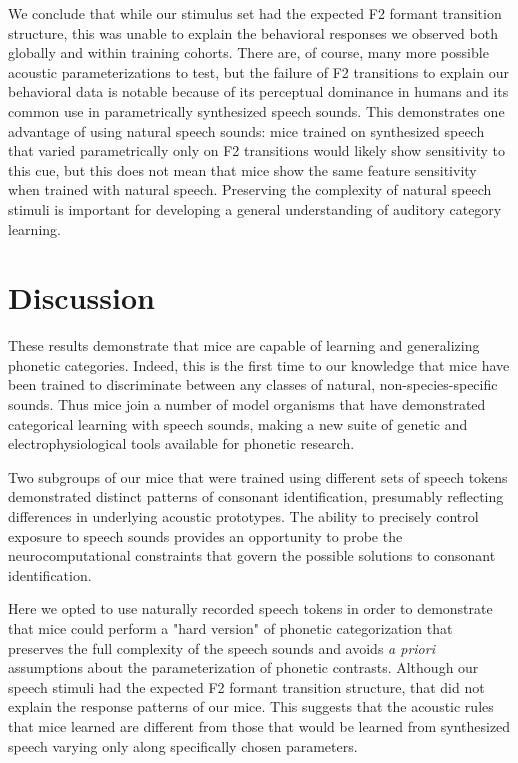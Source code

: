 \documentclass[preprint, NumberedRefs]{JASAnew}\usepackage[]{graphicx}\usepackage[]{color}
\begin{document}
We conclude that while our stimulus set had the expected F2 formant transition structure, this was unable to explain the behavioral responses we observed both globally and within training cohorts. There are, of course, many more possible acoustic parameterizations to test, but the failure of F2 transitions to explain our behavioral data is notable because of its perceptual dominance in humans and its common use in parametrically synthesized speech sounds. This demonstrates one advantage of using natural speech sounds: mice trained on synthesized speech that varied parametrically only on F2 transitions would likely show sensitivity to this cue, but this does not mean that mice show the same feature sensitivity when trained with natural speech. Preserving the complexity of natural speech stimuli is important for developing a general understanding of auditory category learning.

%
%

\section{\Large Discussion}

These results demonstrate that mice are capable of learning and generalizing phonetic categories. Indeed, this is the first time to our knowledge that mice have been trained to discriminate between any classes of natural, non-species-specific sounds. Thus mice join a number of model organisms that have demonstrated categorical learning with speech sounds\cite{Kluender1987,Lotto1997,Kluender2000,Kuhl1978,Engineer2015,Kuhl1983,Dooling1995}, making a new suite of genetic and electrophysiological tools available for phonetic research.

Two subgroups of our mice that were trained using different sets of speech tokens demonstrated distinct patterns of consonant identification, presumably reflecting differences in underlying acoustic prototypes. The ability to precisely control exposure to speech sounds provides an opportunity to probe the neurocomputational constraints that govern the possible solutions to consonant identification.

Here we opted to use naturally recorded speech tokens in order to demonstrate that mice could perform a "hard version" of phonetic categorization that preserves the full complexity of the speech sounds and avoids \textit{a priori} assumptions about the parameterization of phonetic contrasts. Although our speech stimuli had the expected F2 formant transition structure, that did not explain the response patterns of our mice. This suggests that the acoustic rules that mice learned are different from those that would be learned from synthesized speech varying only along specifically chosen parameters.
\end{document}
